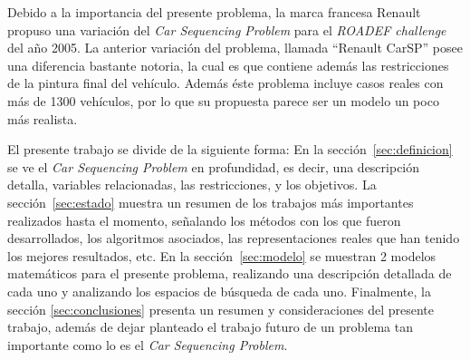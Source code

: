 Debido a la importancia del presente problema, la marca francesa Renault propuso una variación del \emph{Car Sequencing Problem}
para el \emph{ROADEF challenge} del año 2005. La anterior variación del problema, llamada ``Renault CarSP'' posee una
diferencia bastante notoria, la cual es que contiene además las restricciones de la pintura final del vehículo.
Además éste problema incluye casos reales con más de 1300 vehículos, por lo que su propuesta parece ser un modelo un poco
más realista.

El presente trabajo se divide de la siguiente forma:
En la sección~\ref{sec:definicion}
se ve el \emph{Car Sequencing Problem} en profundidad, es decir, una descripción detalla, variables
relacionadas, las restricciones, y los objetivos.
La sección~\ref{sec:estado} muestra un resumen de los trabajos más importantes realizados hasta el momento,
señalando los métodos con los que fueron desarrollados, los algoritmos asociados, las representaciones
reales que han tenido los mejores resultados, etc.
En la sección~\ref{sec:modelo}
se muestran 2 modelos matemáticos para el presente problema, realizando una descripción detallada
de cada uno y analizando los espacios de búsqueda de cada uno.
Finalmente,
la sección \ref{sec:conclusiones} presenta un resumen
y consideraciones del presente trabajo,
además de dejar planteado el trabajo futuro de un problema tan importante como lo es el \emph{Car
Sequencing Problem}.


